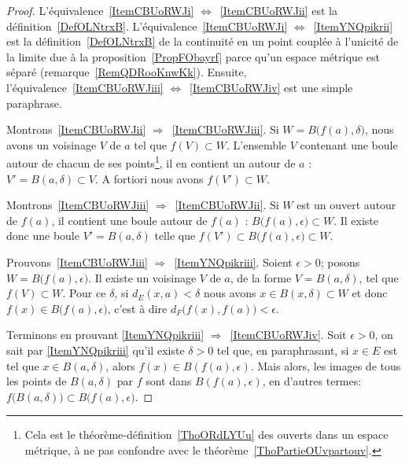 \begin{proof}
    L'équivalence~\ref{ItemCBUoRWJi} \( \Leftrightarrow\)~\ref{ItemCBUoRWJii} est la définition~\ref{DefOLNtrxB}. L'équivalence~\ref{ItemCBUoRWJi} \( \Leftrightarrow\)~\ref{ItemYNQpikrii} est la définition~\ref{DefOLNtrxB} de la continuité en un point couplée à l'unicité de la limite due à la proposition~\ref{PropFObayrf} parce qu'un espace métrique est séparé (remarque~\ref{RemQDRooKnwKk}). Ensuite, l'équivalence~\ref{ItemCBUoRWJiii} \( \Leftrightarrow\)~\ref{ItemCBUoRWJiv} est une simple paraphrase.

    Montrons~\ref{ItemCBUoRWJii} \( \Rightarrow\)~\ref{ItemCBUoRWJiii}. Si \( W=B\big( f(a),\delta \big)\), nous avons un voisinage \( V\) de \( a\) tel que \( f(V)\subset W\). L'ensemble \( V\) contenant une boule autour de chacun de ses points\footnote{Cela est le théorème-définition~\ref{ThoORdLYUu} des ouverts dans un espace métrique, à ne pas confondre avec le théorème~\ref{ThoPartieOUvpartouv}.}, il en contient un autour de \( a\) : \( V'=B(a,\delta)\subset V\). A fortiori nous avons \( f(V')\subset W\).

    Montrons~\ref{ItemCBUoRWJiii} \( \Rightarrow\)~\ref{ItemCBUoRWJii}. Si \( W\) est un ouvert autour de \( f(a)\), il contient une boule autour de \( f(a)\) : \(B\big( f(a),\epsilon \big)\subset W\). Il existe donc une boule \( V'=B(a,\delta)\) telle que \( f(V')\subset B\big( f(a),\epsilon \big)\subset W\).

    Prouvons~\ref{ItemCBUoRWJiii} \( \Rightarrow\)~\ref{ItemYNQpikriii}. Soient \( \epsilon>0\); posons \( W=B\big( f(a),\epsilon \big)\). Il existe un voisinage \( V\) de \( a\), de la forme \( V = B(a, \delta) \), tel que \( f(V)\subset W\). Pour ce \( \delta \), si \( d_E(x,a) <\delta\) nous avons \( x\in B(x,\delta)\subset W\) et donc \( f(x)\in B\big( f(a),\epsilon \big)\), c'est à dire \( d_F\bigl(f(x),f(a)\bigr)<\epsilon\).

    Terminons en prouvant \ref{ItemYNQpikriii} \( \Rightarrow\)~\ref{ItemCBUoRWJiv}. Soit \( \epsilon > 0 \), on sait par \ref{ItemYNQpikriii} qu'il existe \( \delta > 0 \) tel que, en paraphrasant, si \( x \in E \) est tel que \( x \in B(a,\delta)\), alors \( f(x) \in B(f(a),\epsilon)\). Mais alors, les images de tous les points de \(B(a,\delta)\) par \( f \) sont dans \( B(f(a),\epsilon)\), en d'autres termes: \( f\big( B(a,\delta) \big)\subset B\big( f(a),\epsilon \big) \).
\end{proof}

